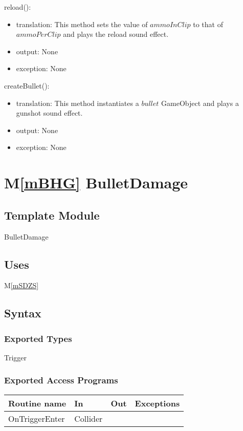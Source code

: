 \documentclass[12pt]{article}
\newcommand{\mref}[1]{M\ref{#1}}
\begin{document}
\noindent reload():
\begin{itemize}
	\item translation: This method sets the value of $ammoInClip$ to that of $ammoPerClip$ and plays the reload sound effect.
	\item output: None
	\item exception: None
\end{itemize}

\noindent createBullet():
\begin{itemize}
	\item translation: This method instantiates a $bullet$ GameObject and plays a gunshot sound effect.
	\item output: None
	\item exception: None
\end{itemize}

\newpage
\section*{\mref{mBHG} BulletDamage}

\subsection*{Template Module}

BulletDamage

\subsection* {Uses}

\mref{mSDZS}

\subsection* {Syntax}

\subsubsection* {Exported Types}

Trigger

\subsubsection* {Exported Access Programs}

\begin{tabular}{| l | l | l | l |}
	\hline
	\textbf{Routine name} & \textbf{In} & \textbf{Out} & \textbf{Exceptions}\\
	\hline
	OnTriggerEnter & Collider & ~  & ~\\
	\hline
\end{tabular}
\end{document}
